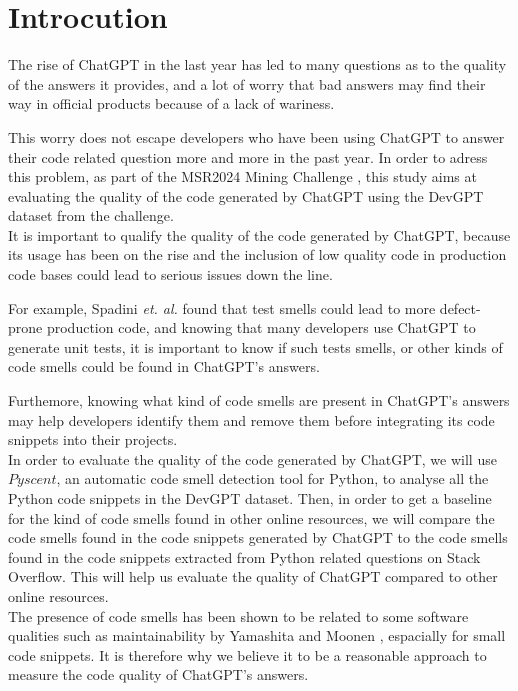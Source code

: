 \section{Introcution}
\label{sec:introduction}
The rise of ChatGPT in the last year has led to many questions as to the quality of the answers it provides, and a lot of worry that bad answers may find their way in official products because of a lack of wariness.

This worry does not escape developers who have been using ChatGPT to answer their code related question more and more in the past year. In order to adress this problem, as part of the MSR2024 Mining Challenge \cite{msr-2024}, this study aims at evaluating the quality of the code generated by ChatGPT using the DevGPT dataset from the challenge. \\

It is important to qualify the quality of the code generated by ChatGPT, because its usage has been on the rise and the inclusion of low quality code in production code bases could lead to serious issues down the line.

For example, Spadini \textit{et. al.} \cite{spadini-2018} found that test smells could lead to more defect-prone production code, and knowing that many developers use ChatGPT to generate unit tests, it is important to know if such tests smells, or other kinds of code smells could be found in ChatGPT's answers.

Furthemore, knowing what kind of code smells are present in ChatGPT's answers may help developers identify them and remove them before integrating its code snippets into their projects. \\

In order to evaluate the quality of the code generated by ChatGPT, we will use $Pyscent$, an automatic code smell detection tool for Python, to analyse all the Python code snippets in the DevGPT dataset. Then, in order to get a baseline for the kind of code smells found in other online resources, we will compare the code smells found in the code snippets generated by ChatGPT to the code smells found in the code snippets extracted from Python related questions on Stack Overflow. This will help us evaluate the quality of ChatGPT compared to other online resources. \\

The presence of code smells has been shown to be related to some software qualities such as maintainability by Yamashita and Moonen \cite{yamashita-2012}, espacially for small code snippets. It is therefore why we believe it to be a reasonable approach to measure the code quality of ChatGPT's answers.\\

